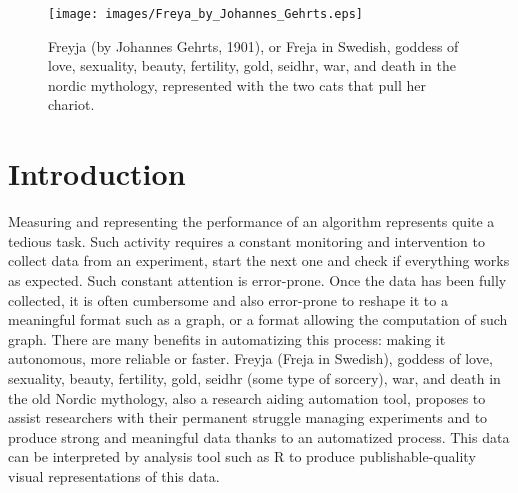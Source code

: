 \begin{figure}[h]
\centering
\texttt{[image: images/Freya\_by\_Johannes\_Gehrts.eps]}
\caption{Freyja (by Johannes Gehrts, 1901), or Freja in Swedish, goddess of love, sexuality, beauty, fertility, gold, seidhr, war, and death in the nordic mythology, represented with the two cats that pull her chariot.}
\end{figure}

\section{Introduction}
Measuring and representing the performance of an algorithm represents quite a tedious task. Such activity requires a constant monitoring and intervention to collect data from an experiment, start the next one and check if everything works as expected.
Such constant attention is error-prone. Once the data has been fully collected, it is often cumbersome and also error-prone to reshape it to a meaningful format such as a graph, or a format allowing the computation of such graph.
There are many benefits in automatizing this process: making it autonomous, more reliable or faster.
Freyja (Freja in Swedish), goddess of love, sexuality, beauty, fertility, gold, seidhr (some type of sorcery), war, and death in the old Nordic mythology, also a research aiding automation tool, proposes to assist researchers with their permanent struggle managing experiments and to produce strong and meaningful data thanks to an automatized process. This data can be interpreted by analysis tool such as R to produce publishable-quality visual representations of this data. 

